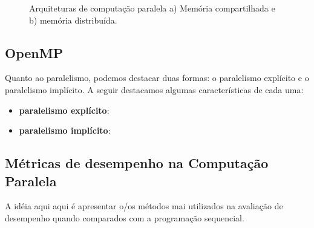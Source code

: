 \begin{figure}[h]
\center
{}\label{fig_Compartilhada}
\qquad
{}
\caption{Arquiteturas de computação paralela a) Memória compartilhada e b) memória distribuída.}\label{fig_Ditribuida}
\end{figure}


\subsection{OpenMP}

Quanto ao paralelismo, podemos destacar duas formas: o paralelismo explícito e o paralelismo implícito. A seguir destacamos algumas características de cada uma:

\begin{itemize}
\item \textbf{paralelismo explícito}:

\item \textbf{paralelismo implícito}:

\end{itemize}


\subsection{Métricas de desempenho na Computação Paralela}

{\color{red} A idéia aqui aqui é apresentar o/os métodos mai utilizados na avaliação de desempenho quando comparados com a programação sequencial.}





